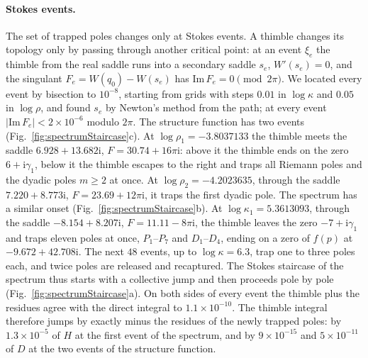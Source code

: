 \documentclass[aip,pof,preprint,floatfix,nofootinbib,amsmath,amssymb]{revtex4-2}
\def\I{\mathrm{i}}
\begin{document}
\paragraph*{Stokes events.}\label{sec:stokesEvents}
The set of trapped poles changes only at Stokes events. A thimble changes its topology only by passing through another
critical point: at an event $\xi_e$ the thimble from the real saddle runs into a secondary saddle $s_e$, $W'(s_e)=0$, and the
singulant $F_e=W(q_0)-W(s_e)$ has $\mathrm{Im}\,F_e=0\pmod{2\pi}$. We located every event by bisection to $10^{-8}$,
starting from grids with steps $0.01$ in $\log\kappa$ and $0.05$ in $\log\rho$, and found $s_e$ by Newton's method from the
path; at every event $|\mathrm{Im}\,F_e|<2\times10^{-6}$ modulo $2\pi$. The structure function has two events
(Fig.~\ref{fig:spectrumStaircase}c). At $\log\rho_1=-3.8037133$ the thimble meets the saddle $6.928+13.682\I$,
$F=30.74+16\pi\I$: above it the thimble ends on the zero $6+\I\gamma_1$, below it the thimble escapes to the right and traps
all Riemann poles and the dyadic poles $m\ge2$ at once. At $\log\rho_2=-4.2023635$, through the saddle $7.220+8.773\I$,
$F=23.69+12\pi\I$, it traps the first dyadic pole. The spectrum has a similar onset (Fig.~\ref{fig:spectrumStaircase}b). At
$\log\kappa_1=5.3613093$, through the saddle $-8.154+8.207\I$, $F=11.11-8\pi\I$, the thimble leaves the zero $-7+\I\gamma_1$
and traps eleven poles at once, $P_1$--$P_7$ and $D_1$--$D_4$, ending on a zero of $f(p)$ at $-9.672+42.708\I$. The next
$48$ events, up to $\log\kappa=6.3$, trap one to three poles each, and twice poles are released and recaptured. The Stokes
staircase of the spectrum thus starts with a collective jump and then proceeds pole by pole
(Fig.~\ref{fig:spectrumStaircase}a). On both sides of every event the thimble plus the residues agree with the direct
integral to $1.1\times10^{-10}$. The thimble integral therefore jumps by exactly minus the residues of the newly trapped
poles: by $1.3\times10^{-5}$ of $H$ at the first event of the spectrum, and by $9\times10^{-15}$ and $5\times10^{-11}$ of $D$
at the two events of the structure function.
\end{document}
